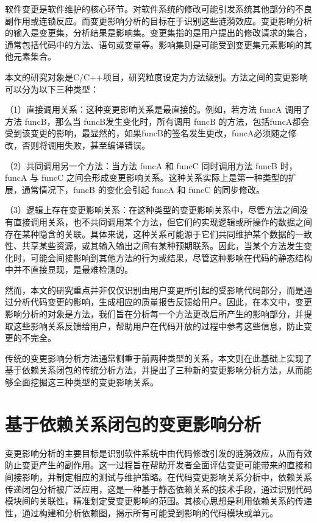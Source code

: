 软件变更是软件维护的核心环节。对软件系统的修改可能引发系统其他部分的不良副作用或连锁反应。而变更影响分析的目标在于识别这些涟漪效应。变更影响分析的输入是变更集，分析结果是影响集。变更集指的是用户提出的修改请求的集合，通常包括代码中的方法、语句或变量等。影响集则是可能受到变更集元素影响的其他元素集合。

本文的研究对象是C/C++项目，研究粒度设定为方法级别。方法之间的变更影响可以分为以下三种类型：

（1）直接调用关系：这种变更影响关系是最直接的。例如，若方法 funcA 调用了方法 funcB，那么当 funcB发生变化时，所有调用 funcB 的方法，包括funcA都会受到该变更的影响，最显然的，如果funcB的签名发生更改，funcA必须随之修改，否则将调用失败，甚至编译错误。

（2）共同调用另一个方法：当方法 funcA 和 funcC 同时调用方法 funcB 时，funcA 与 funcC 之间会形成变更影响关系。这种关系实际上是第一种类型的扩展，通常情况下，funcB 的变化会引起 funcA 和 funcC 的同步修改。

（3）逻辑上存在变更影响关系：在这种类型的变更影响关系中，尽管方法之间没有直接调用关系，也不共同调用某个方法，但它们的实现逻辑或所操作的数据之间存在某种隐含的关联。具体来说，这种关系可能源于它们共同维护某个数据的一致性、共享某些资源，或其输入输出之间有某种预期联系。因此，当某个方法发生变化时，可能会间接影响到其他方法的行为或结果，尽管这种影响在代码的静态结构中并不直接显现，是最难检测的。

然而，本文的研究重点并非仅仅识别由用户变更所引起的受影响代码部分，而是通过分析代码变更的影响，生成相应的质量报告反馈给用户。因此，在本文中，变更影响分析的对象是方法，我们旨在分析每一个方法更改后所产生的影响部分，并提取这些影响关系反馈给用户，帮助用户在代码开放的过程中参考这些信息，防止变更的不完全。

传统的变更影响分析方法通常侧重于前两种类型的关系，本文则在此基础上实现了基于依赖关系闭包的传统分析方法，并提出了三种新的变更影响分析方法，从而能够全面挖掘这三种类型的变更影响关系。

\section{基于依赖关系闭包的变更影响分析}

变更影响分析的主要目标是识别软件系统中由代码修改引发的涟漪效应，从而有效防止变更产生的副作用。这一过程旨在帮助开发者全面评估变更可能带来的直接和间接影响，并制定相应的测试与维护策略。在代码变更影响关系分析中，依赖关系传递闭包分析被广泛应用，这是一种基于静态依赖关系的技术手段，通过识别代码模块间的关联性，精准划定受变更影响的范围\cite{2021Improving}。其核心思想是利用依赖关系的传递性，通过构建和分析依赖图，揭示所有可能受到影响的代码模块或单元。

